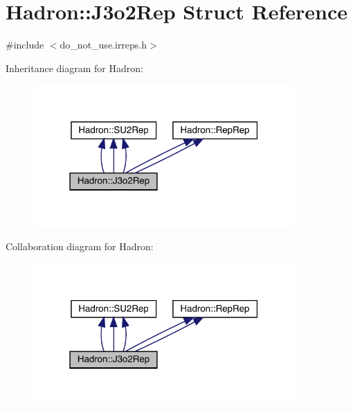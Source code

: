 \hypertarget{structHadron_1_1J3o2Rep}{}\section{Hadron\+:\+:J3o2\+Rep Struct Reference}
\label{structHadron_1_1J3o2Rep}


{\ttfamily \#include $<$do\+\_\+not\+\_\+use.\+irreps.\+h$>$}



Inheritance diagram for Hadron\+:
\nopagebreak
\begin{figure}[H]
\begin{center}
\leavevmode
\includegraphics[width=283pt]{d2/d39/structHadron_1_1J3o2Rep__inherit__graph}
\end{center}
\end{figure}


Collaboration diagram for Hadron\+:
\nopagebreak
\begin{figure}[H]
\begin{center}
\leavevmode
\includegraphics[width=283pt]{d1/da4/structHadron_1_1J3o2Rep__coll__graph}
\end{center}
\end{figure}
